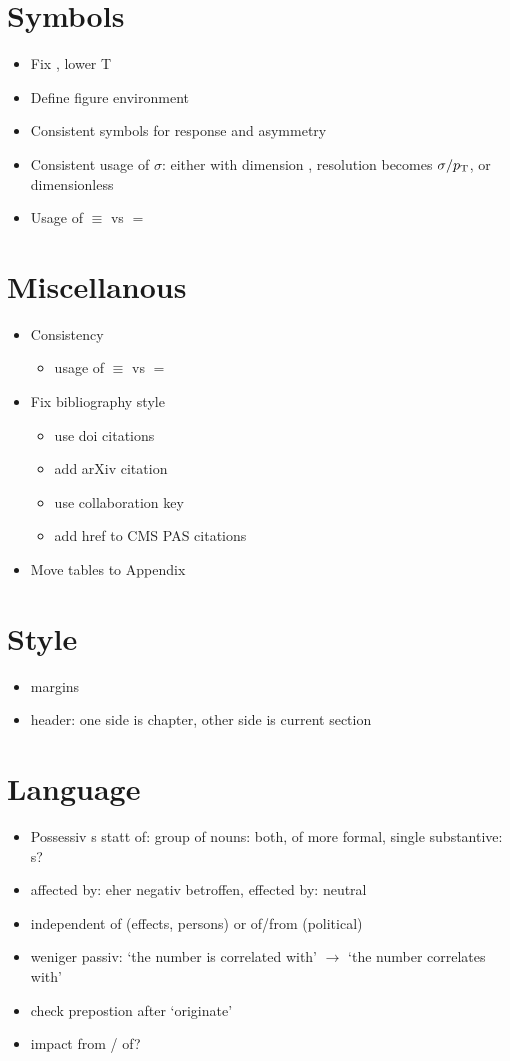 \documentclass[
a4,
oneside,
headsepline,     %
normalheadings,
openany,
numbers=noenddot %
]{scrreprt} %
\begin{document}
\section{Symbols}
\begin{itemize}
\item Fix \pt, lower T
\item Define figure environment
\item Consistent symbols for response and asymmetry
\item Consistent usage of $\sigma$: either with dimension \gev, \ie
  resolution becomes $\sigma/p_{\text{T}}$, or dimensionless
\item Usage of $\equiv$ vs $=$
\end{itemize}

\section{Miscellanous}
\begin{itemize}
\item Consistency
  \begin{itemize}
  \item usage of $\equiv$ vs $=$
  \end{itemize}
\item Fix bibliography style
  \begin{itemize}
  \item use doi citations
  \item add arXiv citation
  \item use collaboration key
  \item add href to CMS PAS citations
  \end{itemize}
\item Move tables to Appendix
\end{itemize}


\section{Style}
\begin{itemize}
\item margins
\item header: one side is chapter, other side is current section
\end{itemize}

\section{Language}
\begin{itemize}
\item Possessiv s statt of: group of nouns: both, of more formal, single substantive: s?
\item affected by: eher negativ betroffen, effected by: neutral
\item independent of (effects, persons) or of/from (political)
\item weniger passiv: `the number is correlated with' $\rightarrow$ `the number correlates with'
\item check prepostion after `originate'
\item impact from / of?
\end{itemize}
\end{document}
